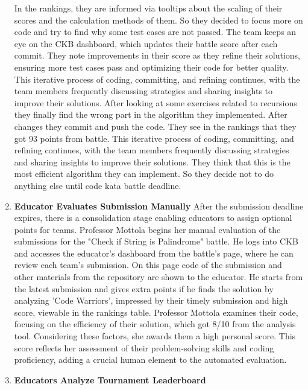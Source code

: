 \begin{enumerate}
    In the rankings, they are informed via tooltips about the scaling of their scores and the calculation methods of them. So they decided to focus more on code and try to find why some test cases are not passed. The team keeps an eye on the CKB dashboard, which updates their battle score after each commit. They note improvements in their score as they refine their solutions, ensuring more test cases pass and optimizing their code for better quality. This iterative process of coding, committing, and refining continues, with the team members frequently discussing strategies and sharing insights to improve their solutions. After looking at some exercises related to recursions they finally find the wrong part in the algorithm they implemented. After changes they commit and push the code. They see in the rankings that they got 93 points from battle. This iterative process of coding, committing, and refining continues, with the team members frequently discussing strategies and sharing insights to improve their solutions. They think that this is the most efficient algorithm they can implement. So they decide not to do anything else until code kata battle deadline. \newline
    \item \textbf{Educator Evaluates Submission Manually} \newline
    After the submission deadline expires, there is a consolidation stage enabling educators to assign optional points for teams. Professor Mottola begins her manual evaluation of the submissions for the "Check if String is Palindrome" battle. He logs into CKB and accesses the educator's dashboard from the battle's page, where he can review each team's submission. On this page code of the submission and other materials from the repository are shown to the educator. He starts from the latest submission and gives extra points if he finds the solution by analyzing 'Code Warriors', impressed by their timely submission and high score, viewable in the rankings table. Professor Mottola examines their code, focusing on the efficiency of their solution, which got 8/10 from the analysis tool. Considering these factors, she awards them a high personal score. This score reflects her assessment of their problem-solving skills and coding proficiency, adding a crucial human element to the automated evaluation. 
    \item \textbf{Educators Analyze Tournament Leaderboard} \newline

\end{enumerate}
